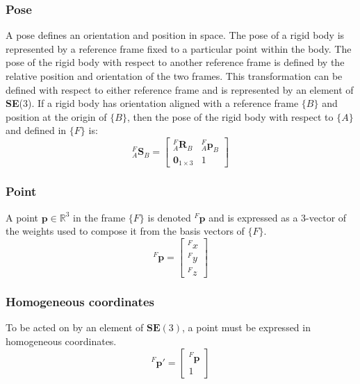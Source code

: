 		\subsubsection{Pose}
		A pose defines an orientation and position in space. The pose of a rigid body is represented by a reference frame fixed to a particular point within the body. The pose of the rigid body with respect to another reference frame is defined by the relative position and orientation of the two frames. This transformation can be defined with respect to either reference frame and is represented by an element of \textbf{SE}(3). If a rigid body has orientation aligned with a reference frame $\{B\}$ and position at the origin of $\{B\}$, then the pose of the rigid body with respect to $\{A\}$ and defined in $\{F\}$ is:
		\begin{equation}
			{^{F}_{A}\mathbf{S}^{}_{B}} = 
			\begin{bmatrix}
				^{F}_{A}\mathbf{R}^{}_{B}	& 	^{F}_{A}\mathbf{p}^{}_{B}\\
				\textbf{0}_{1 \times 3} & 1						  
			\end{bmatrix}
		\end{equation}		
		
		\subsubsection{Point}
		A point $\mathbf{p} \in \mathbb{R}^3$ in the frame $\{F\}$ is denoted $^F\mathbf{p}$ and is expressed as a 3-vector of the weights used to compose it from the basis vectors of $\{F\}$.
		\begin{equation}
			^{F}\mathbf{p} = 
			\begin{bmatrix}
				^{F}x \\
				^{F}y \\
				^{F}z
			\end{bmatrix}
		\end{equation}
		
		\subsubsection{Homogeneous coordinates}
		To be acted on by an element of $\mathbf{SE}(3)$, a point must be expressed in homogeneous coordinates.
		\begin{equation}
			^{F}\mathbf{p'} = 
			\begin{bmatrix}
				^{F}\mathbf{p} \\
				1
			\end{bmatrix}
		\end{equation}
		

